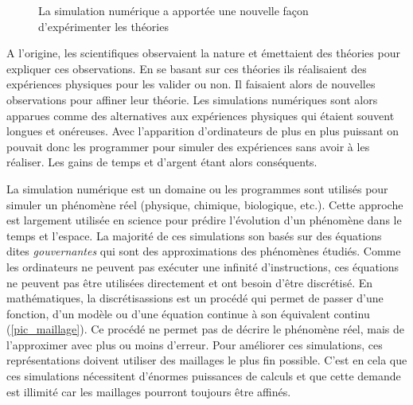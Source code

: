 \begin{figure}
\begin{center}
\begin{minipage}[]{.5\textwidth}


\end{minipage}
\end{center}


 \caption{La simulation numérique a apportée une nouvelle façon d'expérimenter les théories \cite{BSC_FIB_SCA}} 
 \label{fig:tikz_simulation}
 \end{figure}

A l'origine, les scientifiques observaient la nature et émettaient des théories pour expliquer ces observations. En se basant sur ces théories ils réalisaient des expériences physiques pour les valider ou non. Il faisaient alors de nouvelles observations pour affiner leur théorie. Les simulations numériques sont alors apparues comme des alternatives aux expériences physiques qui étaient souvent longues et onéreuses. Avec l'apparition d'ordinateurs de plus en plus puissant on pouvait donc les programmer pour simuler des expériences sans avoir à les réaliser. Les gains de temps et d'argent étant alors conséquents.

La simulation numérique est un domaine ou les programmes sont utilisés pour simuler un phénomène réel (physique, chimique, biologique, etc.). Cette approche est largement utilisée en science pour prédire l'évolution d'un phénomène dans le temps et l'espace. La majorité de ces simulations son basés sur des équations dites \textit{gouvernantes} qui sont des approximations des phénomènes étudiés. Comme les ordinateurs ne peuvent pas exécuter une infinité d'instructions, ces équations ne peuvent pas être utilisées directement et ont besoin d'être discrétisé. En mathématiques, la discrétisassions est un procédé  qui permet de passer d'une fonction, d'un modèle ou d'une équation continue à son équivalent continu (\autoref{pic_maillage}). Ce procédé ne permet pas de décrire le phénomène réel, mais de l'approximer avec plus ou moins d'erreur. Pour améliorer ces simulations, ces représentations doivent utiliser des maillages le plus fin possible. C'est en cela que ces simulations nécessitent d'énormes puissances de calculs et que cette demande est illimité car les maillages pourront toujours être affinés. 

